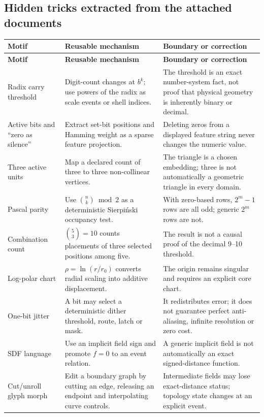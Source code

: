\documentclass[10pt,a4paper]{article}
\begin{document}
\subsection{Hidden tricks extracted from the attached documents}
\renewcommand{\arraystretch}{1.15}
\begin{longtable}{>{\raggedright\arraybackslash}p{3.3cm}>{\raggedright\arraybackslash}p{6.0cm}>{\raggedright\arraybackslash}p{6.2cm}}
\toprule
\textbf{Motif} & \textbf{Reusable mechanism} & \textbf{Boundary or correction} \\
\midrule
\endfirsthead
\toprule
\textbf{Motif} & \textbf{Reusable mechanism} & \textbf{Boundary or correction} \\
\midrule
\endhead
Radix carry threshold & Digit-count changes at $b^k$; use powers of the radix as scale events or shell indices. & The threshold is an exact number-system fact, not proof that physical geometry is inherently binary or decimal. \\
Active bits and ``zero as silence'' & Extract set-bit positions and Hamming weight as a sparse feature projection. & Deleting zeros from a displayed feature string never changes the numeric value. \\
Three active units & Map a declared count of three to three non-collinear vertices. & The triangle is a chosen embedding; three is not automatically a geometric triangle in every domain. \\
Pascal parity & Use $\binom{n}{k}\bmod 2$ as a deterministic Sierpiński occupancy test. & With zero-based rows, $2^m-1$ rows are all odd; generic $2^m$ rows are not. \\
Combination count & $\binom{5}{3}=10$ counts placements of three selected positions among five. & The result is not a causal proof of the decimal 9--10 threshold. \\
Log-polar chart & $\rho=\ln(r/r_0)$ converts radial scaling into additive displacement. & The origin remains singular and requires an explicit core chart. \\
One-bit jitter & A bit may select a deterministic dither threshold, route, latch or mask. & It redistributes error; it does not guarantee perfect anti-aliasing, infinite resolution or zero cost. \\
SDF language & Use an implicit field sign and promote $f=0$ to an event relation. & A generic implicit field is not automatically an exact signed-distance function. \\
Cut/unroll glyph morph & Edit a boundary graph by cutting an edge, releasing an endpoint and interpolating curve controls. & Intermediate fields may lose exact-distance status; topology state changes at an explicit event. \\

\end{longtable}
\end{document}
